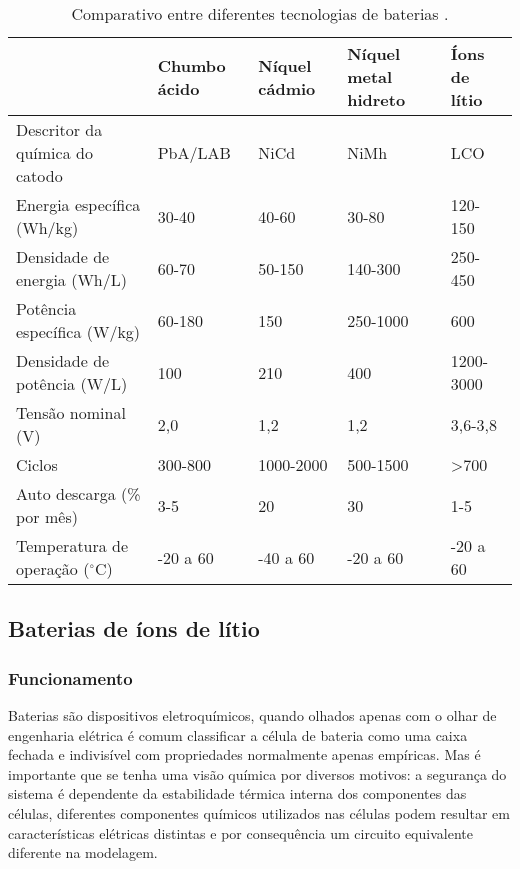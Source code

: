       \begin{table}[!htp]
         \centering
         \caption{Comparativo entre diferentes tecnologias de baterias \cite{War15}.}
         \label{tab:bat-tecnologias}
         \begin{tabular}{l m{1.9cm} m{1.9cm} m{2.2cm} m{2.2cm}}
            \hline
            \multicolumn{1}{c}{}                   & Chumbo ácido    & Níquel cádmio   & Níquel metal hidreto  & Íons de lítio\\
            \hline
            Descritor da química do catodo         & PbA/LAB         & NiCd            & NiMh                  & LCO          \\
            Energia específica (Wh/kg)             & 30-40           & 40-60           & 30-80                 & 120-150      \\
            Densidade de energia (Wh/L)            & 60-70           & 50-150          & 140-300               & 250-450      \\
            Potência específica (W/kg)             & 60-180          & 150             & 250-1000              & 600          \\
            Densidade de potência (W/L)            & 100             & 210             & 400                   & 1200-3000    \\
            Tensão nominal (V)                     & 2,0             & 1,2             & 1,2                   & 3,6-3,8      \\
            Ciclos                                 & 300-800         & 1000-2000       & 500-1500              & >700         \\
            Auto descarga (\% por mês)             & 3-5             & 20              & 30                    & 1-5          \\
            Temperatura de operação ($^{\circ}$C)  & -20 a 60        & -40 a 60        & -20 a 60              & -20 a 60     \\
            \hline
         \end{tabular}
      \end{table}
      
   \subsection{Baterias de íons de lítio}
      \subsubsection{Funcionamento}
         Baterias são dispositivos eletroquímicos, quando olhados apenas com o olhar de engenharia elétrica é comum classificar a célula de bateria como uma caixa fechada e indivisível com propriedades normalmente apenas empíricas. Mas é importante que se tenha uma visão química por diversos motivos: a segurança do sistema é dependente da estabilidade térmica interna dos componentes das células, diferentes componentes químicos utilizados nas células podem resultar em características elétricas distintas e por consequência um circuito equivalente diferente na modelagem. 

